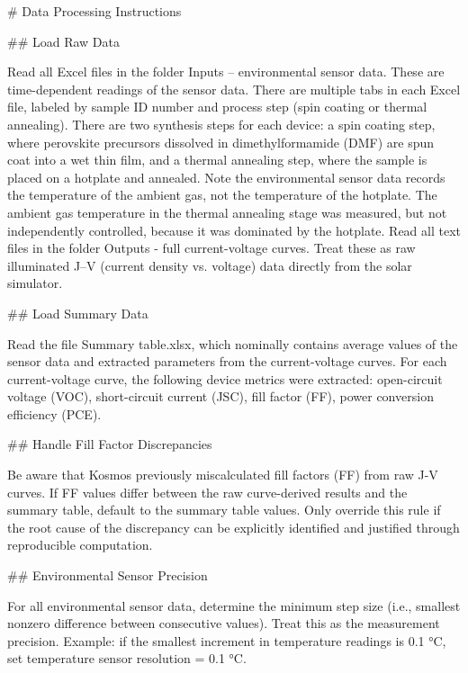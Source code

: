 \documentclass{article}
\begin{document}
\noindent \# Data Processing Instructions \par
\noindent \#\# Load Raw Data \par
Read all Excel files in the folder Inputs – environmental sensor data. These are time-dependent readings of the sensor data.
There are multiple tabs in each Excel file, labeled by sample ID number and process step (spin coating or thermal annealing).
There are two synthesis steps for each device: a spin coating step, where perovskite precursors dissolved in dimethylformamide (DMF) are spun coat into a wet thin film, and a thermal annealing step, where the sample is placed on a hotplate and annealed.
Note the environmental sensor data records the temperature of the ambient gas, not the temperature of the hotplate. The ambient gas temperature in the thermal annealing stage was measured, but not independently controlled, because it was dominated by the hotplate.
Read all text files in the folder Outputs - full current-voltage curves. Treat these as raw illuminated J--V (current density vs. voltage) data directly from the solar simulator. \par
\noindent \#\# Load Summary Data \par
Read the file Summary table.xlsx, which nominally contains average values of the sensor data and extracted parameters from the current-voltage curves.
For each current-voltage curve, the following device metrics were extracted: open-circuit voltage (VOC), short-circuit current (JSC), fill factor (FF), power conversion efficiency (PCE). \par
\noindent \#\# Handle Fill Factor Discrepancies \par
Be aware that Kosmos previously miscalculated fill factors (FF) from raw J-V curves.
If FF values differ between the raw curve-derived results and the summary table, default to the summary table values.
Only override this rule if the root cause of the discrepancy can be explicitly identified and justified through reproducible computation. \par
\noindent \#\# Environmental Sensor Precision \par
For all environmental sensor data, determine the minimum step size (i.e., smallest nonzero difference between consecutive values).
Treat this as the measurement precision.
Example: if the smallest increment in temperature readings is 0.1 °C, set temperature sensor resolution = 0.1 °C. \par

\vspace{1em}
\end{document}
